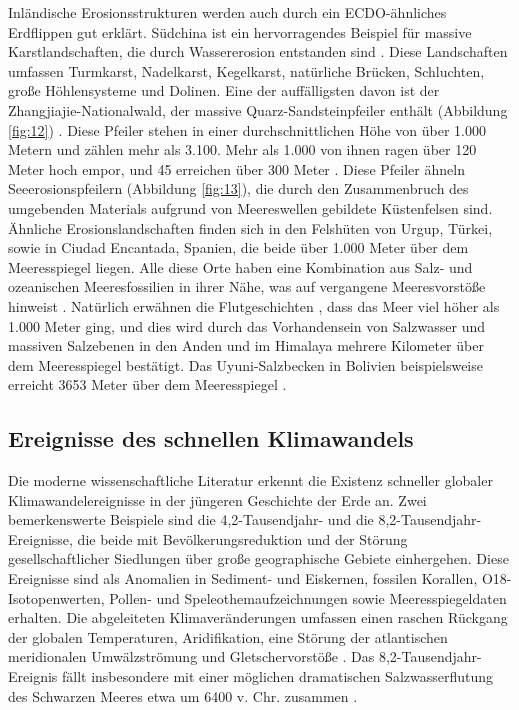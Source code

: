 \documentclass[10pt,twocolumn,letterpaper]{article}
\begin{document}
Inländische Erosionsstrukturen werden auch durch ein ECDO-ähnliches Erdflippen gut erklärt. Südchina ist ein hervorragendes Beispiel für massive Karstlandschaften, die durch Wassererosion entstanden sind \cite{82}. Diese Landschaften umfassen Turmkarst, Nadelkarst, Kegelkarst, natürliche Brücken, Schluchten, große Höhlensysteme und Dolinen. Eine der auffälligsten davon ist der Zhangjiajie-Nationalwald, der massive Quarz-Sandsteinpfeiler enthält (Abbildung \ref{fig:12}) \cite{84}. Diese Pfeiler stehen in einer durchschnittlichen Höhe von über 1.000 Metern und zählen mehr als 3.100. Mehr als 1.000 von ihnen ragen über 120 Meter hoch empor, und 45 erreichen über 300 Meter \cite{85}. Diese Pfeiler ähneln Seeerosionspfeilern (Abbildung \ref{fig:13}), die durch den Zusammenbruch des umgebenden Materials aufgrund von Meereswellen gebildete Küstenfelsen sind. Ähnliche Erosionslandschaften finden sich in den Felshüten von Urgup, Türkei, sowie in Ciudad Encantada, Spanien, die beide über 1.000 Meter über dem Meeresspiegel liegen. Alle diese Orte haben eine Kombination aus Salz- und ozeanischen Meeresfossilien in ihrer Nähe, was auf vergangene Meeresvorstöße hinweist \cite{15,86,87}. Natürlich erwähnen die Flutgeschichten \cite{3}, dass das Meer viel höher als 1.000 Meter ging, und dies wird durch das Vorhandensein von Salzwasser und massiven Salzebenen in den Anden und im Himalaya mehrere Kilometer über dem Meeresspiegel bestätigt. Das Uyuni-Salzbecken in Bolivien beispielsweise erreicht 3653 Meter über dem Meeresspiegel \cite{94}.

\subsection{Ereignisse des schnellen Klimawandels}

Die moderne wissenschaftliche Literatur erkennt die Existenz schneller globaler Klimawandelereignisse in der jüngeren Geschichte der Erde an. Zwei bemerkenswerte Beispiele sind die 4,2-Tausendjahr- und die 8,2-Tausendjahr-Ereignisse, die beide mit Bevölkerungsreduktion und der Störung gesellschaftlicher Siedlungen über große geographische Gebiete einhergehen. Diese Ereignisse sind als Anomalien in Sediment- und Eiskernen, fossilen Korallen, O18-Isotopenwerten, Pollen- und Speleothemaufzeichnungen sowie Meeresspiegeldaten erhalten. Die abgeleiteten Klimaveränderungen umfassen einen raschen Rückgang der globalen Temperaturen, Aridifikation, eine Störung der atlantischen meridionalen Umwälzströmung und Gletschervorstöße \cite{90,91,92}. Das 8,2-Tausendjahr-Ereignis fällt insbesondere mit einer möglichen dramatischen Salzwasserflutung des Schwarzen Meeres etwa um 6400 v. Chr. zusammen \cite{93}.
\end{document}
